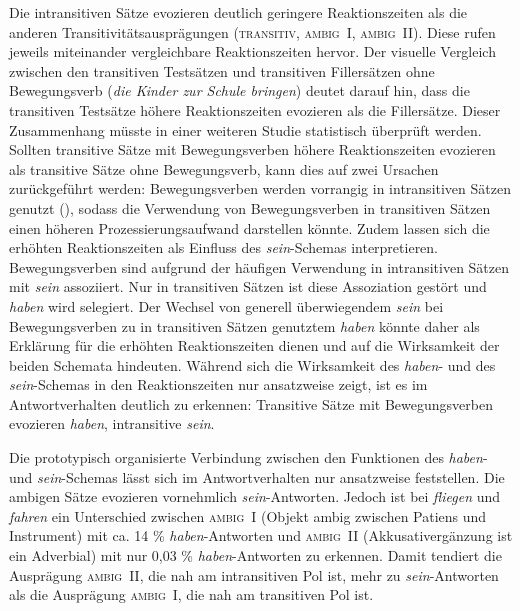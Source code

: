 Die intransitiven Sätze evozieren deutlich geringere Reaktionszeiten als die anderen Transitivitätsausprägungen (\textsc{transitiv}, \textsc{ambig~I}, \textsc{ambig~II}). Diese rufen jeweils miteinander vergleichbare Reaktionszeiten hervor. Der visuelle Vergleich zwischen den transitiven Testsätzen und transitiven Fillersätzen ohne Bewegungsverb (\textit{die Kinder zur Schule bringen}) deutet darauf hin, dass die transitiven Testsätze höhere Reaktionszeiten evozieren als die Fillersätze. Dieser Zusammenhang müsste in einer weiteren Studie statistisch überprüft werden. Sollten transitive Sätze mit Bewegungsverben höhere Reaktionszeiten evozieren als transitive Sätze ohne Bewegungsverb, kann dies auf zwei Ursachen zurückgeführt werden: Bewegungsverben werden vorrangig in intransitiven Sätzen genutzt (\cite[267--268]{Gillmann.2016}), sodass die Verwendung von Bewegungsverben in transitiven Sätzen einen höheren Prozessierungsaufwand darstellen könnte. Zudem lassen sich die erhöhten Reaktionszeiten als Einfluss des \textit{sein}-Schemas interpretieren. Bewegungsverben sind aufgrund der häufigen Verwendung in intransitiven Sätzen mit \textit{sein} assoziiert. Nur in transitiven Sätzen ist diese Assoziation gestört und \textit{haben} wird selegiert. Der Wechsel von generell überwiegendem \textit{sein} bei Bewegungsverben zu in transitiven Sätzen genutztem \textit{haben} könnte daher als Erklärung für die erhöhten Reaktionszeiten dienen und auf die Wirksamkeit der beiden Schemata hindeuten. Während sich die Wirksamkeit des \textit{haben}- und des \textit{sein}-Schemas in den Reak\-tionszeiten nur ansatzweise zeigt, ist es im Antwortverhalten deutlich zu erkennen: Transitive Sätze mit Bewegungsverben evozieren \textit{haben}, intransitive \textit{sein}.

Die prototypisch organisierte Verbindung zwischen den Funktionen des \textit{haben}- und \textit{sein}-Schemas lässt sich im Antwortverhalten nur ansatzweise feststellen. Die ambigen Sätze evozieren vornehmlich \textit{sein}-Antworten. Jedoch ist bei \textit{fliegen} und \textit{fahren} ein Unterschied zwischen \textsc{ambig~I} (Objekt ambig zwischen Patiens und Instrument) mit ca. 14 \% \textit{haben}-Antworten  und \textsc{ambig~II} (Akkusativergänzung ist ein Adverbial) mit nur 0,03 \% \textit{haben}-Antworten zu erkennen. Damit tendiert die Ausprägung \textsc{ambig~II}, die nah am intransitiven Pol ist,  mehr zu \textit{sein}-Antworten als die Ausprägung \textsc{ambig~I}, die nah am transitiven Pol ist. 


